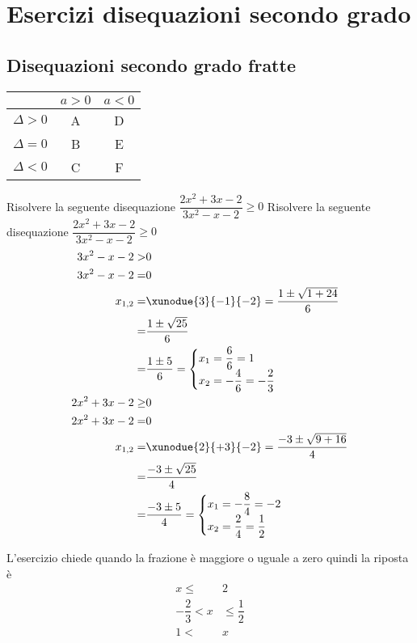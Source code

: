 \tcbstartrecording
\chapter{Esercizi disequazioni secondo grado}
\section{Disequazioni secondo grado fratte}
{\centering \begin{tabular}{ccc}
\toprule
	& $a>0$ &  $a<0$\\ 
	\midrule
$\Delta >0$	& A  & D \\ 
$\Delta=0$	& B & E \\ 
$\Delta<0$	& C &  F\\ 
\bottomrule
\end{tabular}\par }
\begin{exercise}
	Risolvere la seguente disequazione $\dfrac{2x^2+3x-2}{3x^2-x-2}\geq 0$
\tcblower
	Risolvere la seguente disequazione $\dfrac{2x^2+3x-2}{3x^2-x-2}\geq 0$
\begin{align*}
3x^2-x-2>&0\\
3x^2-x-2=&0\\
x_{1,2}=&\xunodue{3}{-1}{-2}=\dfrac{1\pm\sqrt{1+24}}{6}\\
=&\dfrac{1\pm\sqrt{25}}{6}\\
=&\dfrac{1\pm 5}{6}=\begin{cases}
x_1=\dfrac{6}{6}=1\\
x_2=-\dfrac{4}{6}=-\dfrac{2}{3}
\end{cases}\\
2x^2+3x-2\geq&0\\
2x^2+3x-2=&0\\
x_{1,2}=&\xunodue{2}{+3}{-2}=\dfrac{-3\pm\sqrt{9+16}}{4}\\
=&\dfrac{-3\pm\sqrt{25}}{4}\\
=&\dfrac{-3\pm 5}{4}=\begin{cases}
x_1=-\dfrac{8}{4}=-2\\
x_2=\dfrac{2}{4}=\dfrac{1}{2}
\end{cases}\\
\end{align*}
\begin{center}
	
\end{center}
L'esercizio chiede quando la frazione è maggiore o uguale a zero quindi la riposta è 
\begin{align*}
x\leq& 2\\ -\dfrac{2}{3}<x&\leq \dfrac{1}{2}\\ 1<&x\\
\end{align*}
\end{exercise}
